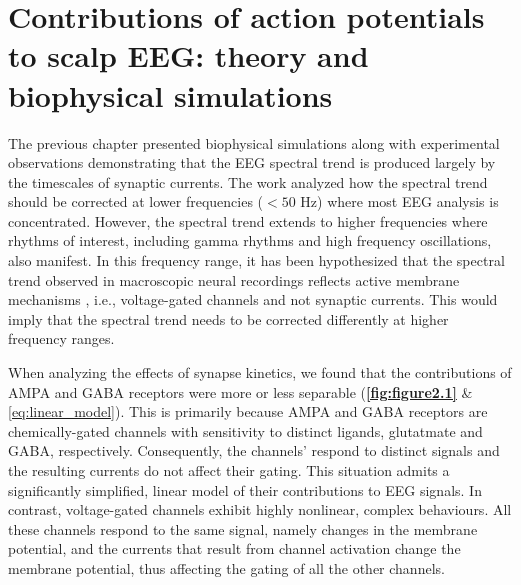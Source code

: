 \chapter{Contributions of action potentials to scalp EEG: theory and biophysical simulations}
\label{sec:apEEG}
\renewcommand{\figurename}{Fig}

The previous chapter presented biophysical simulations along with experimental observations demonstrating that the EEG spectral trend is produced largely by the timescales of synaptic currents. The work analyzed how the spectral trend should be corrected at lower frequencies ($<50$ \unit{\hertz}) where most EEG analysis is concentrated. However, the spectral trend extends to higher frequencies where rhythms of interest, including gamma rhythms and high frequency oscillations, also manifest. In this frequency range, it has been hypothesized that the spectral trend observed in macroscopic neural recordings reflects active membrane mechanisms \cite{Gao2016}, i.e., voltage-gated channels and not synaptic currents. This would imply that the spectral trend needs to be corrected differently at higher frequency ranges. 

When analyzing the effects of synapse kinetics, we found that the contributions of AMPA and GABA receptors were more or less separable (\textbf{\autoref{fig:figure2.1}} \& \ref{eq:linear_model}). This is primarily because AMPA and GABA receptors are chemically-gated channels with sensitivity to distinct ligands, glutatmate and GABA, respectively. Consequently, the channels' respond to distinct signals and the resulting currents do not affect their gating. This situation admits a significantly simplified, linear model of their contributions to EEG signals. In contrast, voltage-gated channels exhibit highly nonlinear, complex behaviours. All these channels respond to the same signal, namely changes in the membrane potential, and the currents that result from channel activation change the membrane potential, thus affecting the gating of all the other channels.

